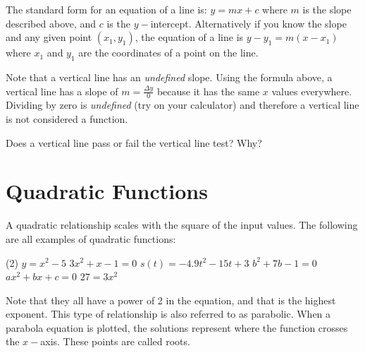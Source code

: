  
 The standard form for an equation of a line is: $y =m x +c$ where $m$ is the slope described above, and $c$ is the $y-$intercept. Alternatively if you know the slope and any given point $(x_1,y_1)$, the equation of a line is $y -y_{1} =m (x -x_{1})$ where $x_1$ and $y_1$ are the coordinates of a point on the line.

Note that a vertical line has an \textit{undefined} slope. Using the formula above, a vertical line has a slope of $m=\frac{\Delta y}{0}$ because it has the same $x$ values everywhere. Dividing by zero is \textit{undefined} (try on your calculator) and therefore a vertical line is not considered a function.

\exercise Does a vertical line pass or fail the vertical line test? Why?

\section*{Quadratic Functions}
A quadratic relationship scales with the square of the input values. The following are all examples of quadratic functions:
 \begin{tasks}[style=itemize](2)
 	\task $ y=x^2-5$
	\task $ 3x^2+x-1=0$
 	\task $ s(t)=-4.9t^2-15t+3$
 	\task $ b^2+7b-1=0$
 	\task $ ax^2+bx+c=0$
 	\task $ 27=3x^2$
 \end{tasks}
Note that they all have a power of 2 in the equation, and that is the highest exponent. This type of relationship is also referred to as parabolic. When a parabola equation is plotted, the solutions represent where the function crosses the $x-$axis. These points are called roots.
 

